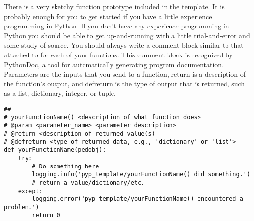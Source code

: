 There is a very sketchy function prototype included in the template.  It is probably enough for you to get started if you have
a little experience programming in Python.  If you don't have any experience programming in Python you should be able to get
up-and-running with a little trial-and-error and some study of \PyPedal{} source.  You should always write a comment block similar to that attached to  for each of your functions.  This comment block is recognized by PythonDoc, a tool for automatically generating program documentation.  Parameters are the inputs that you send to a function, return is a description of the function's output, and defreturn is the type of output that is returned, such as a list, dictionary, integer, or tuple.
\begin{verbatim}
##
# yourFunctionName() <description of what function does>
# @param <parameter_name> <parameter description>
# @return <description of returned value(s)
# @defreturn <type of returned data, e.g., 'dictionary' or 'list'>
def yourFunctionName(pedobj):
    try:
        # Do something here
        logging.info('pyp_template/yourFunctionName() did something.')
        # return a value/dictionary/etc.
    except:
        logging.error('pyp_template/yourFunctionName() encountered a problem.')
        return 0
\end{verbatim}
